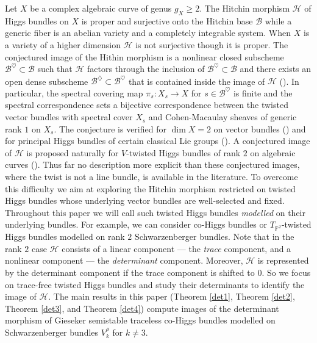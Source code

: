 \documentclass[12pt]{amsart}
\theoremstyle{definition}
\theoremstyle{remark}
\numberwithin{equation}{section}
\begin{document}
Let $X$ be a complex algebraic curve of genus $g_X\geq 2$. The Hitchin morphism $\mathcal{H}$ of Higgs bundles on $X$ is proper and surjective onto the Hitchin base $\mathcal{B}$ while a generic fiber is an abelian variety and a completely integrable system. When $X$ is a variety of a higher dimension $\mathcal{H}$ is not surjective though it is proper. The conjectured image of the Hithin morphism is a nonlinear closed subscheme $\mathcal{B}^{\heartsuit}\subset\mathcal{B}$ such that $\mathcal{H}$ factors through the inclusion of $\mathcal{B}^{\heartsuit}\subset\mathcal{B}$ and there exists an open dense subscheme $\mathcal{B}^{\diamondsuit}\subset \mathcal{B}^{\heartsuit}$ that is contained inside the image of $\mathcal{H}$ (\cite{Bao}). In particular, the spectral covering map $\pi_s: X_s\to X$ for $s\in\mathcal{B}^{\heartsuit}$ is finite and the spectral correspondence sets a bijective correspondence between the twisted vector bundles with spectral cover $X_s$ and Cohen-Macaulay sheaves of generic rank $1$ on $X_s$. The conjecture is verified for $\dim X = 2$ on vector bundles (\cite{hao}) and for principal Higgs bundles of certain classical Lie groups (\cite{huynh}). A conjectured image of $\mathcal{H}$ is proposed naturally for $V$-twisted Higgs bundles of rank $2$ on algebraic curves (\cite{Gallego}). Thus far no description more explicit than these conjectured images, where the twist is not a line bundle, is available in the literature. To overcome this difficulty we aim at exploring the Hitchin morphism restricted on twisted Higgs bundles whose underlying vector bundles are well-selected and fixed. Throughout this paper we will call such twisted Higgs bundles \textit{modelled} on their underlying bundles. For example, we can consider co-Higgs bundles or $T_{\mathbb{P}^2}$-twisted Higgs bundles modelled on rank $2$ Schwarzenberger bundles. Note that in the rank $2$ case $\mathcal{H}$ consists of a linear component --- the \textit{trace} component, and a nonlinear component --- the \textit{determinant} component. Moreover, $\mathcal{H}$ is represented by the determinant component if the trace component is shifted to $0$. So we focus on trace-free twisted Higgs bundles and study their determinants to identify the image of $\mathcal{H}$. The main results in this paper (Theorem \ref{det1}, Theorem \ref{det2}, Theorem \ref{det3}, and Theorem \ref{det4}) compute images of the determinant morphism of Gieseker semistable traceless co-Higgs bundles modelled on Schwarzenberger bundles $V_k^\rho$ for $k\neq 3$.\\ 
\end{document}
